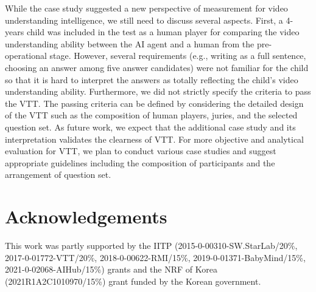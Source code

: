 \documentclass[letterpaper]{article} %
\begin{document}
While the case study suggested a new perspective of measurement for video understanding intelligence, we still need to discuss several aspects. First, a 4-years child was included in the test as a human player for comparing the video understanding ability between the AI agent and a human from the pre-operational stage. However, several requirements (e.g., writing as a full sentence, choosing an answer among five answer candidates) were not familiar for the child so that it is hard to interpret the answers as totally reflecting the child's video understanding ability. 
Furthermore, we did not strictly specify the criteria to pass the VTT. The passing criteria can be defined by considering the detailed design of the VTT such as the composition of human players, juries, and the selected question set. As future work, we expect that the additional case study and its interpretation validates the clearness of VTT. For more objective and analytical evaluation for VTT, we plan to conduct various case studies and suggest appropriate guidelines including the composition of participants and the arrangement of question set.

\section{Acknowledgements}
This work was partly supported by the IITP (2015-0-00310-SW.StarLab/20\%, 2017-0-01772-VTT/20\%, 2018-0-00622-RMI/15\%, 2019-0-01371-BabyMind/15\%, 2021-0-02068-AIHub/15\%) grants and the NRF of Korea (2021R1A2C1010970/15\%) grant funded by the Korean government.



\end{document}
